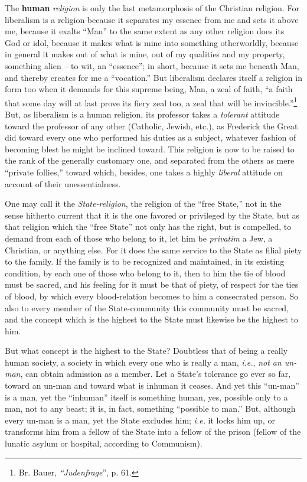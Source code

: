 The \textbf{human} \textit{religion} is only the last metamorphosis of the 
Christian religion. For liberalism is a religion because it separates my 
essence from me and sets it above me, because it exalts ``Man'' to the same 
extent as any other religion does its God or idol, because it makes what is 
mine into something otherworldly, because in general it makes out of what is 
mine, out of my qualities and my property, something alien -- to wit, an 
``essence''; in short, because it sets me beneath Man, and thereby creates 
for me a ``vocation.'' But liberalism declares itself a religion in form too 
when it demands for this supreme being, Man, a zeal of faith, ``a faith that 
some day will at last prove its fiery zeal too, a zeal that will be 
invincible.''\footnote{Br. Bauer, \textit{``Judenfrage}'', p. 61.} But, as 
liberalism is a human religion, its professor takes a \textit{tolerant} 
attitude toward the professor of any other (Catholic, Jewish, etc.), as 
Frederick the Great did toward every one who performed his duties as a 
subject, whatever fashion of becoming blest he might be inclined toward. This 
religion is now to be raised to the rank of the generally customary one, and 
separated from the others as mere ``private follies,'' toward which, 
besides, one takes a highly \textit{liberal} attitude on account of their 
unessentialness.

One may call it the \textit{State-religion}, the religion of the ``free 
State,'' not in the sense hitherto current that it is the one favored or 
privileged by the State, but as that religion which the ``free State'' not 
only has the right, but is compelled, to demand from each of those who belong 
to it, let him be \textit{privatim} a Jew, a Christian, or anything else. For 
it does the same service to the State as filial piety to the family. If the 
family is to be recognized and maintained, in its existing condition, by each 
one of those who belong to it, then to him the tie of blood must be sacred, 
and his feeling for it must be that of piety, of respect for the ties of 
blood, by which every blood-relation becomes to him a consecrated person. So 
also to every member of the State-community this community must be sacred, and 
the concept which is the highest to the State must likewise be the highest to 
him.

But what concept is the highest to the State? Doubtless that of being a really 
human society, a society in which every one who is really a man, \textit{i.e.},
\textit{not an un-man}, can obtain admission as a member. Let a State's 
tolerance go ever so far, toward an un-man and toward what is inhuman it 
ceases. And yet this ``un-man'' is a man, yet the ``inhuman'' itself is 
something human, yes, possible only to a man, not to any beast; it is, in 
fact, something ``possible to man.'' But, although every un-man is a man, 
yet the State excludes him; \textit{i.e.} it locks him up, or transforms him 
from a fellow of the State into a fellow of the prison (fellow of the lunatic 
asylum or hospital, according to Communism).

